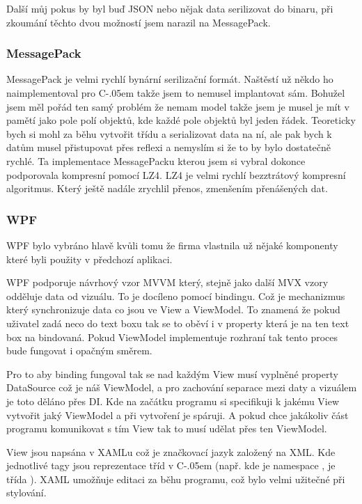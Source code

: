 \documentclass[czech,bachelor,dept460,male,csharp]{diploma}
\newcommand{\Csharp}{%
  {\settoheight{\dimen0}{C}C\kern-.05em \resizebox{!}{\dimen0}{\raisebox{\depth}{\#}}}}
\begin{document}
			Další můj pokus by byl buď JSON nebo nějak data serilizovat do binaru, při zkoumání těchto dvou možností jsem narazil na MessagePack. 
		\subsubsection{MessagePack}
			MessagePack\cite{mpSpec} je velmi rychlí bynární serilizační formát. Naštěstí už někdo ho naimplementoval pro {\Csharp} takže jsem to nemusel implantovat sám. Bohužel jsem měl pořád ten samý problém že nemam model takže jsem je musel je mít v pamětí jako pole polí objektů, kde každé pole objektů byl jeden řádek. Teoreticky bych si mohl za běhu vytvořit třídu a serializovat data na ní, ale pak bych k datům musel přistupovat přes reflexi a nemyslím si že to by bylo dostatečně rychlé. Ta implementace MessagePacku\cite{mpImpl} kterou jsem si vybral dokonce podporovala kompresní pomocí LZ4. LZ4\cite{l4z} je velmi rychlí bezztrátový kompresní algoritmus. Který ještě nadále zrychlil přenos, zmenšením přenášených dat.
		\subsubsection{WPF}
			WPF bylo vybráno hlavě kvůli tomu že firma vlastnila už nějaké komponenty které byli použity v předchozí aplikaci.
			
			WPF podporuje návrhový vzor MVVM který, stejně jako další MVX vzory odděluje data od vizuálu. To je docíleno pomocí bindingu. Což je mechanizmus který synchronizuje data co jsou ve View a ViewModel. To znamená že pokud uživatel zadá neco do text boxu tak se to oběví i v property která je na ten text box na bindovaná. Pokud ViewModel implementuje rozhraní  tak tento proces bude fungovat i opačným směrem.
			
			Pro to aby binding fungoval tak se nad každým View musí vyplněné property DataSource což je náš ViewModel, a pro zachování separace mezi daty a vizuálem je toto děláno přes DI. Kde na začátku programu si specifikuji k jakému View vytvořit jaký ViewModel a při vytvoření je spáruji. A pokud chce jakákoliv část programu komunikovat s tím View tak to musí udělat přes ten ViewModel.
			
			View jsou napsána v XAMLu což je značkovací jazyk založený na XML. Kde jednotlivé tagy jsou reprezentace tříd v {\Csharp} (např.  kde  je namespace , je třída  ). XAML umožňuje editaci za běhu programu, což bylo velmi užitečné při stylování. 
			
\end{document}
